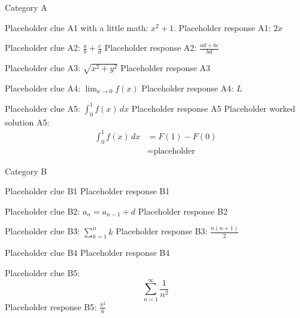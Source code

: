 \documentclass{article}
\begin{document}
\begin{category}{Category A}
  \begin{clue}
    Placeholder clue A1 with a little math: $x^2 + 1.$
  \response
    Placeholder response A1: $2x$
  \end{clue}
  \begin{clue}
    Placeholder clue A2: $\frac{a}{b} + \frac{c}{d}$
  \response
    Placeholder response A2: $\frac{ad + bc}{bd}$
  \end{clue}
  \begin{clue}
    Placeholder clue A3: $\sqrt{x^2 + y^2}$
  \response
    Placeholder response A3
  \end{clue}
  \begin{clue}
    Placeholder clue A4: $\lim_{x \to 0} f(x)$
  \response
    Placeholder response A4: $L$
  \end{clue}
  \begin{clue}
    Placeholder clue A5: $\int_0^1 f(x)\,dx$
  \response
    Placeholder response A5
  \solution
    Placeholder worked solution A5:
    \begin{align*}
      \int_0^1 f(x)\,dx &= F(1) - F(0) \\
                        &= \text{placeholder}
    \end{align*}
  \end{clue}
\end{category}

\begin{category}{Category B}
  \begin{clue}
    Placeholder clue B1
  \response
    Placeholder response B1
  \end{clue}
  \begin{clue}
    Placeholder clue B2: $a_n = a_{n-1} + d$
  \response
    Placeholder response B2
  \end{clue}
  \begin{clue}
    Placeholder clue B3: $\sum_{k=1}^{n} k$
  \response
    Placeholder response B3: $\frac{n(n+1)}{2}$
  \end{clue}
  \begin{clue}
    Placeholder clue B4
  \response
    Placeholder response B4
  \end{clue}
  \begin{clue}
    Placeholder clue B5: \[ \sum_{n=1}^\infty \frac{1}{n^2} \]
  \response
    Placeholder response B5: $\frac{\pi^2}{6}$
  \end{clue}
\end{category}
\end{document}
